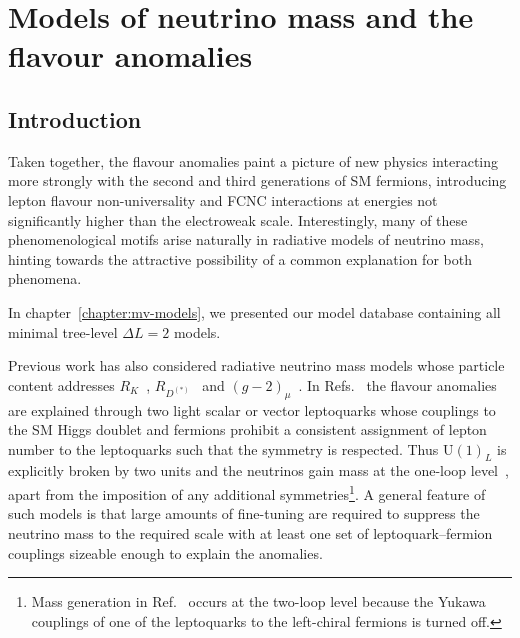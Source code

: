 \graphicspath{{img/chapter_4/}}

\chapter{Models of neutrino mass and the flavour anomalies}
\label{chapter:neutrino-mass-and-flavour-anomalies}

\section{Introduction}

Taken together, the flavour anomalies paint a picture of new physics interacting
more strongly with the second and third generations of SM fermions, introducing
lepton flavour non-universality and FCNC interactions at energies not
significantly higher than the electroweak scale. Interestingly, many of these
phenomenological motifs arise naturally in radiative models of neutrino mass,
hinting towards the attractive possibility of a common explanation for both
phenomena.

In chapter~\ref{chapter:mv-models}, we presented our model database containing
all minimal tree-level $\Delta L = 2$ models.

Previous work has also considered radiative neutrino mass models whose particle
content addresses $R_{K}$~\cite{Pas:2015hca, Cheung:2016fjo, Cheung:2017efc,
  Cheung:2016frv, Popov:2016fzr}, $R_{D^{(*)}}$~\cite{Deppisch:2016qqd,
  Popov:2016fzr} and $(g-2)_\mu$~\cite{Babu:2010vp, Cheung:2016fjo,
  Cheung:2017efc, Cheung:2016frv, Popov:2016fzr}. In Refs.~\cite{Pas:2015hca,
  Deppisch:2016qqd} the flavour anomalies are explained through two light scalar
or vector leptoquarks whose couplings to the SM Higgs doublet and fermions
prohibit a consistent assignment of lepton number to the leptoquarks such that
the symmetry is respected. Thus $\mathrm{U}(1)_L$ is explicitly broken by two
units and the neutrinos gain mass at the one-loop
level~\cite{AristizabalSierra:2007nf}, apart from the imposition of any
additional symmetries\footnote{Mass generation in Ref.~\cite{Babu:2010vp} occurs
  at the two-loop level because the Yukawa couplings of one of the leptoquarks
  to the left-chiral fermions is turned off.}. A general feature of such models
is that large amounts of fine-tuning are required to suppress the neutrino mass
to the required scale with at least one set of leptoquark--fermion couplings
sizeable enough to explain the anomalies.

